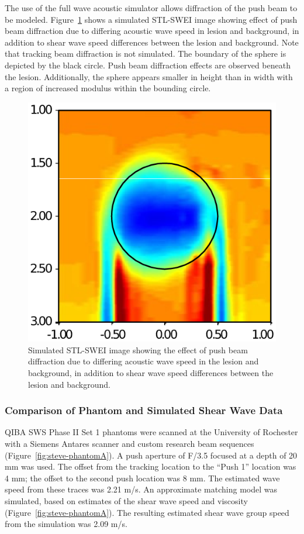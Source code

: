 The use of the full wave acoustic simulator allows diffraction of the push beam
to be modeled. Figure~\ref{fig:steve-stl-swei} shows a simulated STL-SWEI image
showing effect of push beam diffraction due to differing acoustic wave speed in
lesion and background, in addition to shear wave speed differences between the
lesion and background. Note that tracking beam diffraction is not simulated.
The boundary of the sphere is depicted by the black circle. Push beam
diffraction effects are observed beneath the lesion. Additionally, the sphere
appears smaller in height than in width with a region of increased modulus
within the bounding circle.

\begin{figure}[htb!]
    \centering
    \includegraphics[width=0.3\linewidth]{steve/figs/image15.png}
    \caption{Simulated STL-SWEI image showing the effect of push beam
    diffraction due to differing acoustic wave speed in the lesion and
    background, in addition to shear wave speed differences between the lesion
    and background.}
\label{fig:steve-stl-swei}
\end{figure}

\subsubsection{Comparison of Phantom and Simulated Shear Wave Data}
QIBA SWS Phase II Set 1 phantoms were scanned at the University of Rochester
with a Siemens Antares scanner and custom research beam sequences
(Figure~\ref{fig:steve-phantomA}).  A push aperture of F/3.5 focused at a depth
of 20 mm was used. The offset from the tracking location to the ``Push 1''
location was 4 mm; the offset to the second push location was 8 mm.  The
estimated wave speed from these traces was 2.21 m/s.  An approximate matching
model was simulated, based on estimates of the shear wave speed and viscosity
(Figure~\ref{fig:steve-phantomA}). The resulting estimated shear wave group
speed from the simulation was 2.09 m/s.

